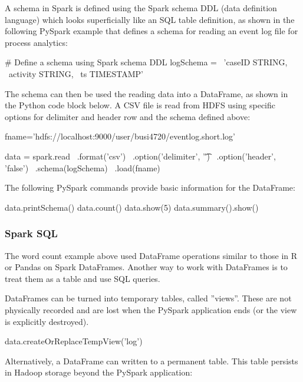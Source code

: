 A schema in Spark is defined using the Spark schema DDL (data definition language) which looks superficially like an SQL table definition, as shown in the following PySpark example that defines a schema for reading an event log file for process analytics:

\begin{pythoncode}
# Define a schema using Spark schema DDL
logSchema = \
    'caseID STRING, \
     activity STRING, \
     ts TIMESTAMP'
\end{pythoncode}

The schema can then be used the reading data into a DataFrame, as shown in the Python code block below. A CSV file is read from HDFS using specific options for delimiter and header row and the schema defined above:

\begin{pythoncode}
fname='hdfs://localhost:9000/user/busi4720/eventlog.short.log'

data = spark.read \
    .format('csv') \
    .option('delimiter', '\t') \
    .option('header', 'false') \
    .schema(logSchema) \
    .load(fname)
\end{pythoncode}

The following PySpark commands provide basic information for the DataFrame:

\begin{pythoncode}
data.printSchema()
data.count()
data.show(5)
data.summary().show()
\end{pythoncode}

\subsubsection*{Spark SQL}

The word count example above used DataFrame operations similar to those in R or Pandas on Spark DataFrames. Another way to work with DataFrames is to treat them as a table and use SQL queries.

DataFrames can be turned into temporary tables, called ''views''. These are not physically recorded and are lost when the PySpark application ends (or the view is explicitly destroyed).

\begin{pythoncode}
data.createOrReplaceTempView('log')
\end{pythoncode}

Alternatively, a DataFrame can written to a permanent table. This table persists in Hadoop storage beyond the PySpark application:

